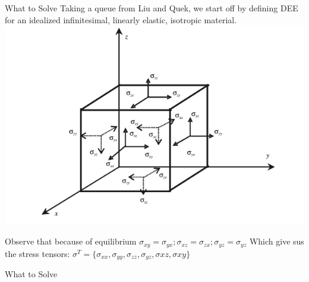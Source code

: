 \documentclass{beamer}
\begin{document}
\begin{frame}{What to Solve}
    Taking a queue from Liu and Quek, we start off by defining DEE for an idealized infinitesimal, linearly elastic, isotropic material.
    \quad\includegraphics[scale = 0.4]{Cube.png}

    Observe that because of equilibrium $\sigma_{xy} = \sigma_{yx}; \sigma_{xz} = \sigma_{zx}; \sigma_{yz}= \sigma_{yz}$ 
    Which give sus the stress tensors: $\sigma^T = \{\sigma_{xx},\sigma_{yy},\sigma_{zz},\sigma_{yz},\sigma{xz},\sigma{xy}\}$
\end{frame}
\begin{frame}{What to Solve}
    
\end{frame}
\end{document}
